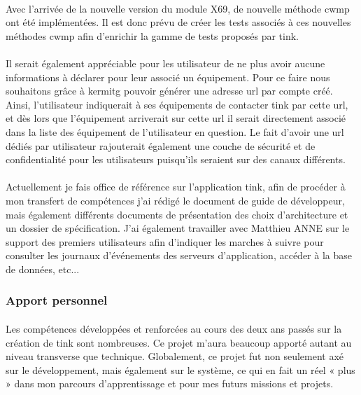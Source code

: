 \documentclass[12pt,a4paper]{report}
\begin{document}
\paragraph*{}Avec l'arrivée de la nouvelle version du module X69, de nouvelle méthode \gls{cwmp} ont été implémentées. Il est donc prévu de créer les tests associés à ces nouvelles méthodes \gls{cwmp} afin d'enrichir la gamme de tests proposés par \gls{tink}.
\paragraph*{}Il serait également appréciable pour les utilisateur de ne plus avoir aucune informations à déclarer pour leur associé un équipement. Pour ce faire nous souhaitons grâce à \gls{kermitg} pouvoir générer une adresse \gls{url} par compte créé. Ainsi, l'utilisateur indiquerait à ses équipements de contacter \gls{tink} par cette \gls{url}, et dès lors que l'équipement arriverait sur cette \gls{url} il serait directement associé dans la liste des équipement de l'utilisateur en question. Le fait d'avoir une \gls{url} dédiés par utilisateur rajouterait également une couche de sécurité et de confidentialité pour les utilisateurs puisqu'ils seraient sur des canaux différents. 
\paragraph*{}Actuellement je fais office de référence sur l'application \gls{tink}, afin de procéder à mon transfert de compétences j'ai rédigé le document de guide de développeur, mais également différents documents de présentation des choix d'architecture et un dossier de spécification. J'ai également travailler avec Matthieu ANNE sur le support des premiers utilisateurs afin d'indiquer les marches à suivre pour consulter les journaux d'événements des serveurs d'application, accéder à la base de données, etc... \\

\subsubsection{Apport personnel}
\paragraph*{}Les compétences développées et renforcées au cours des deux ans passés sur la création de \gls{tink} sont nombreuses. Ce projet m’aura beaucoup apporté autant au niveau transverse que technique. Globalement, ce projet fut non seulement axé sur le développement, mais également sur le système, ce qui en fait un réel « plus » dans mon parcours d’apprentissage et pour mes futurs missions et projets.
\end{document}
